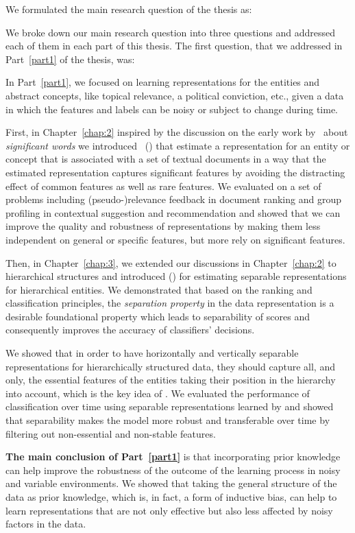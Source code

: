 We formulated the main research question of the thesis as:
%
%

We broke down our main research question into three questions and addressed each of them in each part of this thesis.
The first question, that we addressed in Part~\ref{part1} of the thesis, was:
%

In Part~\ref{part1}, we focused on learning representations for the entities and abstract concepts, like topical relevance, a political conviction, etc., given a data in which the features and labels can be noisy or subject to change during time.

First, in Chapter~\ref{chap:2} inspired by the discussion on the early work by~\citet{Luhn:1958} about \emph{significant words} we introduced \emph{\swlms}\ (\acswlm) that estimate a representation for an entity or concept that is associated with a set of textual documents in a way that the estimated representation captures significant features by avoiding the distracting effect of common features as well as rare features. We evaluated \acswlm on a set of problems including (pseudo-)relevance feedback in document ranking and group profiling in contextual suggestion and recommendation and showed that we can improve the quality and robustness of representations by making them less independent on general or specific features, but more rely on significant features.

Then, in Chapter~\ref{chap:3}, we extended our discussions in Chapter~\ref{chap:2} to hierarchical structures and introduced \hswlms (\achswlm) for estimating separable representations for hierarchical entities. We demonstrated that based on the ranking and classification principles, the \emph{separation property} in the data representation is a desirable foundational property which leads to separability of scores and consequently improves the accuracy of classifiers' decisions. 

We showed that in order to have horizontally and vertically separable representations for hierarchically structured data, they should capture all, and only, the essential features of the entities taking their position in the hierarchy into account, which is the key idea of \achswlm. We evaluated the performance of classification over time using separable representations learned by \achswlm and showed that separability makes the model more robust and transferable over time by filtering out non-essential and non-stable features.

\textbf{The main conclusion of Part~\ref{part1}} is that incorporating prior knowledge can help improve the robustness of the outcome of the learning process in noisy and variable environments. We showed that taking the general structure of the data as prior knowledge, which is, in fact, a form of inductive bias, can help to learn representations that are not only effective but also less affected by noisy factors in the data.

